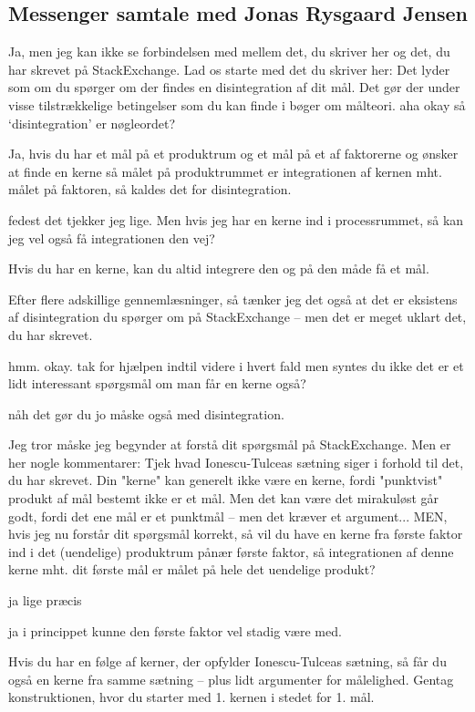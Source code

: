 \documentclass{article}
\begin{document}
\subsection{Messenger samtale med Jonas Rysgaard Jensen}

Ja, men jeg kan ikke se forbindelsen med mellem det, du skriver her og det, du har skrevet på StackExchange. Lad os starte med det du skriver her: Det lyder som om du spørger om der findes en disintegration af dit mål. Det gør der under visse tilstrækkelige betingelser som du kan finde i bøger om målteori.
aha okay så ‘disintegration’ er nøgleordet?

Ja, hvis du har et mål på et produktrum og et mål på et af faktorerne og ønsker at finde en kerne så målet på produktrummet er integrationen af kernen mht. målet på faktoren, så kaldes det for disintegration.

fedest det tjekker jeg lige. Men hvis jeg har en kerne ind i processrummet, så kan jeg vel også få integrationen den vej?

Hvis du har en kerne, kan du altid integrere den og på den måde få et mål.

Efter flere adskillige gennemlæsninger, så tænker jeg det også at det er eksistens af disintegration du spørger om på StackExchange -- men det er meget uklart det, du har skrevet.

hmm. okay. tak for hjælpen indtil videre i hvert fald men syntes du ikke det er et lidt interessant spørgsmål om man får en kerne også?

nåh det gør du jo måske også med disintegration.

Jeg tror måske jeg begynder at forstå dit spørgsmål på StackExchange. Men er her nogle kommentarer: Tjek hvad Ionescu-Tulceas sætning siger i forhold til det, du har skrevet. Din "kerne" kan generelt ikke være en kerne, fordi "punktvist" produkt af mål bestemt ikke er et mål. Men det kan være det mirakuløst går godt, fordi det ene mål er et punktmål -- men det kræver et argument... MEN, hvis jeg nu forstår dit spørgsmål korrekt, så vil du have en kerne fra første faktor ind i det (uendelige) produktrum pånær første faktor, så integrationen af denne kerne mht. dit første mål er målet på hele det uendelige produkt?

ja lige præcis

ja i princippet kunne den første faktor vel stadig være med.

Hvis du har en følge af kerner, der opfylder Ionescu-Tulceas sætning, så får du også en kerne fra samme sætning -- plus lidt argumenter for målelighed. Gentag konstruktionen, hvor du starter med 1. kernen i stedet for 1. mål.
\end{document}
